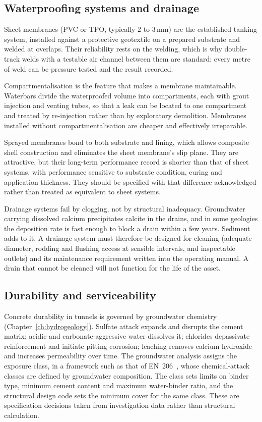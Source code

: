 \subsection{Waterproofing systems and drainage}
\label{sec:waterproofing-systems}

Sheet membranes (PVC or TPO, typically 2 to 3\,mm) are the established
tanking system, installed against a protective geotextile on a prepared
substrate and welded at overlaps. Their reliability rests on the welding, which is why double-track welds with a testable air channel between
them are standard: every metre of weld can be pressure tested and the result
recorded.

Compartmentalisation is the feature that makes a membrane maintainable.
Waterbars divide the waterproofed volume into compartments, each with grout
injection and venting tubes, so that a leak can be located to one compartment
and treated by re-injection rather than by exploratory demolition. Membranes
installed without compartmentalisation are cheaper and effectively
irreparable.

Sprayed membranes bond to both substrate and lining, which allows composite shell construction and eliminates the sheet membrane's slip plane.
They are attractive, but their long-term performance record is shorter than that
of sheet systems, with performance sensitive to substrate condition, curing and
application thickness. They should be specified with that difference
acknowledged rather than treated as equivalent to sheet systems.

Drainage systems fail by clogging, not by structural inadequacy. Groundwater
carrying dissolved calcium precipitates calcite in the drains, and in some
geologies the deposition rate is fast enough to block a drain within a few
years. Sediment adds to it. A drainage system must therefore be designed for
cleaning (adequate diameter, rodding and flushing access at sensible
intervals, and inspectable outlets) and its maintenance requirement written
into the operating manual. A drain that cannot be cleaned will not
function for the life of the asset.

\subsection{Durability and serviceability}
\label{sec:durability-serviceability}

Concrete durability in tunnels is governed by groundwater chemistry
(Chapter~\ref{ch:hydrogeology}). Sulfate
attack expands and disrupts the cement matrix; acidic and carbonate-aggressive
water dissolves it; chlorides depassivate reinforcement and initiate pitting
corrosion; leaching removes calcium hydroxide and increases permeability over
time. The groundwater analysis assigns the exposure class, in a framework
such as that of EN~206~\citep{en206}, whose chemical-attack classes are
defined by groundwater composition. The class sets limits on binder type,
minimum cement content and maximum water-binder ratio, and the structural
design code sets the minimum cover for the same class. These are
specification decisions taken from investigation data rather than structural
calculation.


